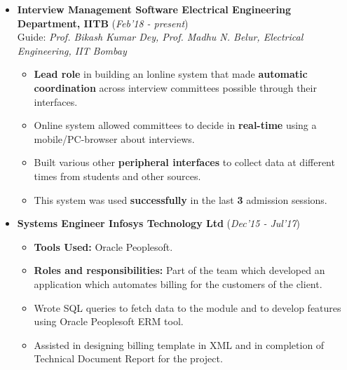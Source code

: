 \documentclass[10pt]{article}
\begin{document}
\vspace{-0.1cm}
\begin{itemize}[leftmargin=0.4cm]
    \item \textbf{Interview Management Software \textpipe \hspace{0.05cm} Electrical Engineering Department, IITB} \hfill{(\textit{Feb'18 - present})}\\
    Guide: \textit{Prof. Bikash Kumar Dey, Prof. Madhu N. Belur, Electrical Engineering, IIT Bombay}\\
\vspace{-0.65cm}
\begin{itemize}

        \item \textbf{Lead role }in building an lonline system that made \textbf{automatic
coordination }across interview committees possible through their interfaces.\vspace{-0.1cm}
        \item Online system allowed committees to decide in \textbf{real-time} using a mobile/PC-browser about interviews.
        \item Built various other \textbf{peripheral
interfaces} to collect data at different times from students and other sources.
        \item This system was used \textbf{successfully} in the last \textbf{3} admission sessions.
    \end{itemize}
\end{itemize}
\vspace{-0.55cm}
\begin{itemize}[leftmargin=0.4cm]
    \item \textbf{Systems Engineer \textpipe  \hspace{0.05cm} Infosys Technology Ltd} \hfill{(\textit{Dec'15 - Jul'17})}\\
    \vspace{-0.65cm}
    \begin{itemize}
        \item  \textbf{Tools Used:} Oracle Peoplesoft.\vspace{-0.07cm}
        \item \textbf{Roles and responsibilities:} Part of the team which developed an application which automates billing for the customers of the client.\vspace{-0.1cm}
        \item Wrote SQL queries to fetch data to the module and to develop features using Oracle Peoplesoft ERM tool.
        \item Assisted in designing billing template in XML and in completion of Technical Document Report for the project.

    \end{itemize}
\end{itemize}
\end{document}
